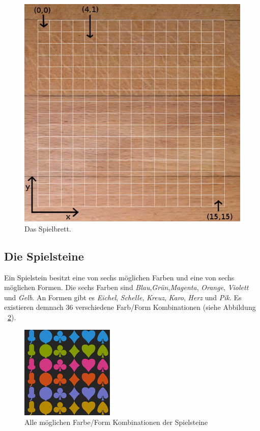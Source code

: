 \documentclass[a4paper, ngerman]{scrartcl}
\begin{document}
\begin{figure}[h] \centering 
	\includegraphics[scale = 0.3]{images/Spielbrett}
	\caption{Das Spielbrett.}
	\label{fig:Spielfeld}
\end{figure}

\subsection{Die Spielsteine}
Ein Spielstein besitzt eine von sechs möglichen Farben und eine von sechs möglichen Formen. Die sechs Farben sind \emph{Blau},\emph{Grün},\emph{Magenta}, \emph{Orange}, \emph{Violett} und \emph{Gelb}. An Formen gibt es \emph{Eichel}, \emph{Schelle}, \emph{Kreuz}, \emph{Karo}, \emph{Herz} und \emph{Pik}.  Es existieren demnach 36 verschiedene Farb/Form Kombinationen (siehe Abbildung ~\ref{fig:Spielsteine}).\\

\begin{figure}[h] \centering 
	\includegraphics[scale = 0.8]{images/Spielsteine}
	\caption{Alle möglichen Farbe/Form Kombinationen der Spielsteine}
	\label{fig:Spielsteine}
\end{figure}
\end{document}
